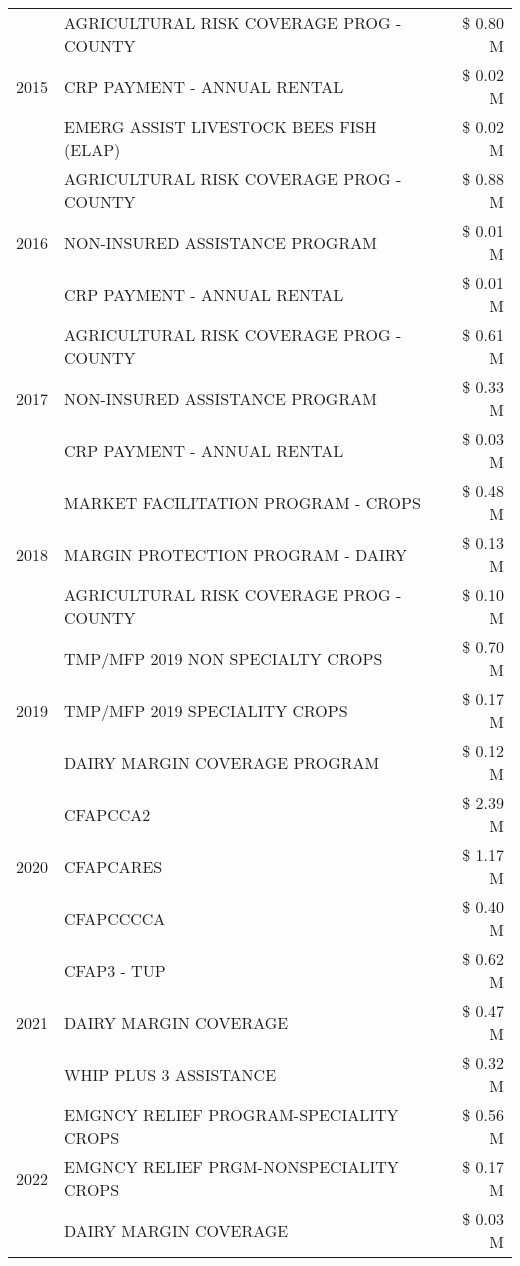 \begin{tabular}{llr}
\multirow[t]{3}{*}{2015} & AGRICULTURAL RISK COVERAGE PROG - COUNTY & \$ 0.80 M \\
 & CRP PAYMENT - ANNUAL RENTAL & \$ 0.02 M \\
 & EMERG ASSIST LIVESTOCK BEES FISH (ELAP) & \$ 0.02 M \\
\cline{1-3}
\multirow[t]{3}{*}{2016} & AGRICULTURAL RISK COVERAGE PROG - COUNTY & \$ 0.88 M \\
 & NON-INSURED ASSISTANCE PROGRAM & \$ 0.01 M \\
 & CRP PAYMENT - ANNUAL RENTAL & \$ 0.01 M \\
\cline{1-3}
\multirow[t]{3}{*}{2017} & AGRICULTURAL RISK COVERAGE PROG - COUNTY & \$ 0.61 M \\
 & NON-INSURED ASSISTANCE PROGRAM & \$ 0.33 M \\
 & CRP PAYMENT - ANNUAL RENTAL & \$ 0.03 M \\
\cline{1-3}
\multirow[t]{3}{*}{2018} & MARKET FACILITATION PROGRAM - CROPS & \$ 0.48 M \\
 & MARGIN PROTECTION PROGRAM - DAIRY & \$ 0.13 M \\
 & AGRICULTURAL RISK COVERAGE PROG - COUNTY & \$ 0.10 M \\
\cline{1-3}
\multirow[t]{3}{*}{2019} & TMP/MFP 2019 NON SPECIALTY CROPS & \$ 0.70 M \\
 & TMP/MFP 2019 SPECIALITY CROPS & \$ 0.17 M \\
 & DAIRY MARGIN COVERAGE PROGRAM & \$ 0.12 M \\
\cline{1-3}
\multirow[t]{3}{*}{2020} & CFAPCCA2 & \$ 2.39 M \\
 & CFAPCARES & \$ 1.17 M \\
 & CFAPCCCCA & \$ 0.40 M \\
\cline{1-3}
\multirow[t]{3}{*}{2021} & CFAP3 - TUP & \$ 0.62 M \\
 & DAIRY MARGIN COVERAGE & \$ 0.47 M \\
 & WHIP PLUS 3 ASSISTANCE & \$ 0.32 M \\
\cline{1-3}
\multirow[t]{3}{*}{2022} & EMGNCY RELIEF PROGRAM-SPECIALITY CROPS & \$ 0.56 M \\
 & EMGNCY RELIEF PRGM-NONSPECIALITY CROPS & \$ 0.17 M \\
 & DAIRY MARGIN COVERAGE & \$ 0.03 M \\
\cline{1-3}
\bottomrule
\end{tabular}
